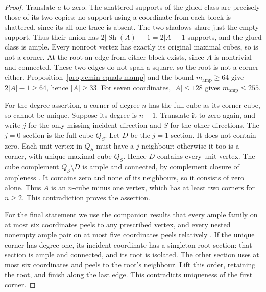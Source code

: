 \documentclass[11pt]{article}
\numberwithin{equation}{section}
\theoremstyle{definition}
\theoremstyle{remark}
\newcommand{\Sh}{\operatorname{Sh}}
\newcommand{\mamp}{m_{\mathrm{amp}}}
\begin{document}
\begin{proof}
Translate $a$ to zero. The shattered supports of the glued class are
precisely those of its two copies: no support using a coordinate from
each block is shattered, since its all-one trace is absent. The two
shadows share just the empty support. Thus their union has
$2|\Sh(A)|-1=2|A|-1$ supports, and the glued class is ample.
Every nonroot vertex has exactly its original maximal cubes, so is
not a corner. At the root an edge from either block exists, since
$A$ is nontrivial and connected. These two edges do not span a square,
so the root is not a corner either. Proposition~\ref{prop:cmin-equals-mamp}
and the bound $\mamp\ge64$ give $2|A|-1\ge64$, hence $|A|\ge33$.
For seven coordinates, $|A|\le128$ gives $\mamp\le255$.

For the degree assertion, a corner of degree $n$ has the full cube as
its corner cube, so cannot be unique. Suppose its degree is $n-1$.
Translate it to zero again, and write $j$ for the only missing incident
direction and $S$ for the other directions. The $j=0$ section is the
full cube $Q_S$. Let $D$ be the $j=1$ section. It does not contain
zero. Each unit vertex in $Q_S$ must have a $j$-neighbour: otherwise
it too is a corner, with unique maximal cube $Q_S$. Hence $D$
contains every unit vertex. The cube complement $Q_S\setminus D$
is ample and connected, by complement closure of ampleness
\cite[Section~3.1]{ChalopiChepoiMoran22}. It contains zero and none
of its neighbours, so it consists of zero alone. Thus $A$ is an
$n$-cube minus one vertex, which has at least two corners for $n\ge2$.
This contradiction proves the assertion.

For the final statement we use the companion results that every ample
family on at most six coordinates peels to any prescribed vertex, and
every nested nonempty ample pair on at most five coordinates peels
relatively \cite{BousquetDampReader}. If the unique corner has degree
one, its incident coordinate has a singleton root section: that
section is ample and connected, and its root is isolated. The other
section uses at most six coordinates and peels to the root's neighbour.
Lift this order, retaining the root, and finish along the last edge.
This contradicts uniqueness of the first corner.


\end{proof}
\end{document}
